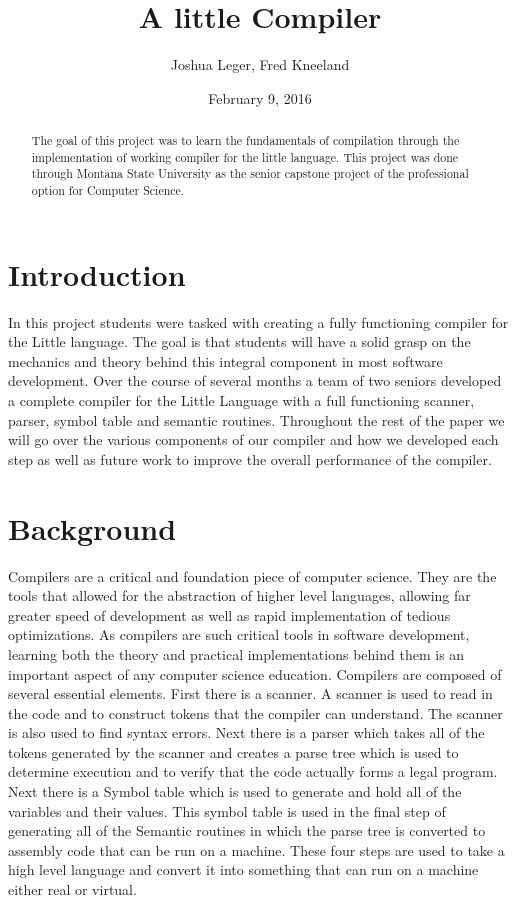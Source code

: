 \documentclass[12pt]{article}
\title{A little Compiler}
\author{Joshua Leger, Fred Kneeland}
\date{February 9, 2016}
\begin{document}
    \maketitle
    \begin{abstract}
    
        The goal of this project was to learn the fundamentals of compilation through the implementation of working compiler for the little language.  This project was done through Montana State University as the senior capstone project of the professional option for Computer Science.   
    
    \end{abstract}
    \clearpage
    \tableofcontents
    \clearpage
    
    \section{Introduction}
        In this project students were tasked with creating a fully functioning compiler for the Little language.  The goal is that students will have a solid grasp on the mechanics and theory behind this integral component in most software development.  Over the course of several months a team of two seniors developed a complete compiler for the Little Language with a full functioning scanner, parser, symbol table and semantic routines.  Throughout the rest of the paper we will go over the various components of our compiler and how we developed each step as well as future work to improve the overall performance of the compiler.
            
    \section{Background}
        Compilers are a critical and foundation piece of computer science.  They are the tools that allowed for the abstraction of higher level languages, allowing far greater speed of development as well as rapid implementation of tedious optimizations.  As compilers are such critical tools in software development, learning both the theory and practical implementations behind them is an important aspect of any computer science education.  
        Compilers are composed of several essential elements.  First there is a scanner.  A scanner is used to read in the code and to construct tokens that the compiler can understand.  The scanner is also used to find syntax errors.  Next there is a parser which takes all of the tokens generated by the scanner and creates a parse tree which is used to determine execution and to verify that the code actually forms a legal program.  Next there is a Symbol table which is used to generate and hold all of the variables and their values.  This symbol table is used in the final step of generating all of the Semantic routines in which the parse tree is converted to assembly code that can be run on a machine.  These four steps are used to take a high level language and convert it into something that can run on a machine either real or virtual. 
        
\end{document}
